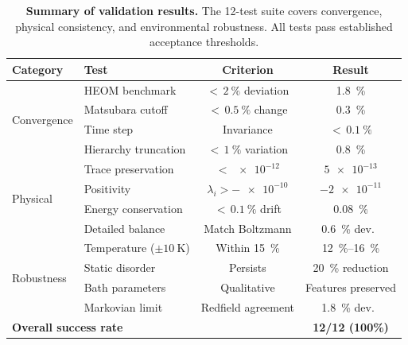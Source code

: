 \documentclass[11pt,a4paper]{article}
\begin{document}
\begin{table}[ht]
\centering
\caption{\textbf{Summary of validation results.} The 12-test suite covers convergence, physical consistency, and environmental robustness. All tests pass established acceptance thresholds.}
\label{tab:validation}
\begin{tabular}{llcc}
	\toprule
	\textbf{Category}            & \textbf{Test}                        &        \textbf{Criterion}         &            \textbf{Result}             \\ \midrule
	\multirow{4}{*}{Convergence} & HEOM benchmark                       & ${<}\,\SI{2}{\percent}$ deviation &     \SI{1.8}{\percent} \checkmark      \\
	                             & Matsubara cutoff                     & ${<}\,\SI{0.5}{\percent}$ change  &     \SI{0.3}{\percent} \checkmark      \\
	                             & Time step                            &            Invariance             &  ${<}\,\SI{0.1}{\percent}$ \checkmark  \\
	                             & Hierarchy truncation                 & ${<}\,\SI{1}{\percent}$ variation &     \SI{0.8}{\percent} \checkmark      \\ \midrule
	\multirow{4}{*}{Physical}    & Trace preservation                   &          ${<}\,\num{e-12}$          &        $\num{5e-13}$ \checkmark        \\
	                             & Positivity                           &      $\lambda_i > -\num{e-10}$      &       $\num{-2e-11}$ \checkmark        \\
	                             & Energy conservation                  &  ${<}\,\SI{0.1}{\percent}$ drift  &     \SI{0.08}{\percent} \checkmark     \\
	                             & Detailed balance                     &          Match Boltzmann          &  \SI{0.6}{\percent} dev.\ \checkmark   \\ \midrule
	\multirow{4}{*}{Robustness}  & Temperature ($\pm \SI{10}{\kelvin}$) &     Within \SI{15}{\percent}      & \SIrange{12}{16}{\percent} \checkmark  \\
	                             & Static disorder                      &             Persists              & \SI{20}{\percent} reduction \checkmark \\
	                             & Bath parameters                      &            Qualitative            &     Features preserved \checkmark      \\
	                             & Markovian limit                      &        Redfield agreement         &  \SI{1.8}{\percent} dev.\ \checkmark   \\ \midrule
	\multicolumn{3}{l}{\textbf{Overall success rate}}                                                       &         \textbf{12/12 (100\%)}         \\ \bottomrule
\end{tabular}
\end{table}
\end{document}
